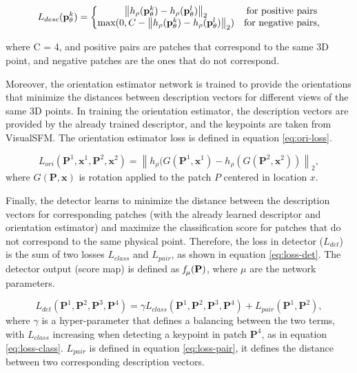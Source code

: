 \begin{equation}
    L_{desc}(\mathbf{p}_{\theta}^{k}) = \left\{\begin{matrix}
 \left \| h_{\rho}(\mathbf{p}_{\theta}^{k}) - h_{\rho}(\mathbf{p}_{\theta}^{l})  \right \|_2 & $for positive pairs$ \\ 
$max$(0, C-\left \| h_{\rho}(\mathbf{p}_{\theta}^{k})  -  h_{\rho}(\mathbf{p}_{\theta}^{l}) \right \|_2) & $for negative pairs,$ 
\end{matrix}\right.
    \label{eq:desc-loss}
\end{equation}

where C = 4, and positive pairs are patches that correspond to the same 3D point, and negative patches are the ones that do not correspond.

Moreover, the orientation estimator network is trained to provide the orientations that minimize the distances between description vectors for different views of the same 3D points. In training the orientation estimator, the description vectors are provided by the already trained descriptor, and the keypoints are taken from VisualSFM. The orientation estimator loss is defined in equation \ref{eq:ori-loss}.

\begin{equation}
    L_{ori}(\mathbf{P}^{1}, \mathbf{x}^{1}, \mathbf{P}^{2}, \mathbf{x}^2) =  \left \| h_{\rho}(G(\mathbf{P}^{1}, \mathbf{x}^{1}) - h_{\rho}(G(\mathbf{P}^{2}, \mathbf{x}^{2})) \right \|_2,
    \label{eq:ori-loss}
\end{equation}
where $G(\mathbf{P},\mathbf{x})$ is rotation applied to the patch $P$ centered in location $x$.

Finally, the detector learns to minimize the distance between the description vectors for corresponding patches (with the already learned descriptor and orientation estimator) and maximize the classification score for patches that do not correspond to the same physical point. Therefore, the loss in detector ($L_{det}$) is the sum of two losses $L_{class}$ and $L_{pair}$, as shown in equation \ref{eq:loss-det}. The detector output (score map) is defined as $\emph{f}_{\mu}(\mathbf{P})$, where $\mu$ are the network parameters.

\begin{equation}
    L_{det}(\mathbf{P}^{1}, \mathbf{P}^{2}, \mathbf{P}^{3}, \mathbf{P}^{4}) = \gamma L_{class}(\mathbf{P}^{1}, \mathbf{P}^{2}, \mathbf{P}^{3}, \mathbf{P}^{4}) + L_{pair}(\mathbf{P}^{1}, \mathbf{P}^{2}),
    \label{eq:loss-det}
\end{equation}
where $\gamma$ is a hyper-parameter that defines a balancing between the two terms, with $L_{class}$ increasing when detecting a keypoint in patch $\mathbf{P}^{4}$, as in equation \ref{eq:loss-class}. $L_{pair}$ is defined in equation \ref{eq:loss-pair}, it defines the distance between two corresponding description vectors.

